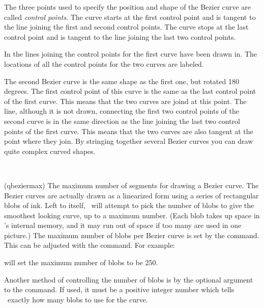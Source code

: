     The three points used to specify the position and shape of the
Bezier curve are called 
\emph{control points}. 
The curve starts at
the first control point and is tangent to the line joining the first
and second control points. The curve stops at the last control point
and is tangent to the line joining the last two control points.

    In  the lines joining the control points for the
first curve have been drawn in. The locations of all the control points
for the two curves are labeled. 

The second Bezier curve is the same shape
as the first one, but rotated 180 degrees. The first control point
of this curve is the same as the last control point of the first curve.
This means that the two curves are joind at this point. The line, 
although it is not drawn,
connecting the first two control points of the second curve is in the
same direction as the line joining the last two control points of the
first curve. This means that the two curves are also tangent at the
point where they join. By stringing together several Bezier curves
you can draw quite complex curved shapes.

\begin{syntax}
\cmd{\qbeziermax} \\
\end{syntax}
\glossary(qbeziermax)
{}{The maximum number of segments for drawing a Bezier curve.}
    The Bezier curves are actually drawn as a 
linearized form
using a series of rectangular
blobs of ink. Left to itself, \ltx\ will attempt to pick the number
of blobs to give the smoothest looking curve, up to a maximum number.
(Each blob takes up space in \ltx 's internal memory, and it may run
out of space if too many are used in one picture.) The maximum number
of blobs per Bezier curve is set by the \cmd{\qbeziermax} command. This
can be adjusted with the \cmd{\renewcommand} command. For example: 
\begin{lcode}
\renewcommand{\qbeziermax}{250}
\end{lcode}
will set the maximum number of blobs to be 250.

    Another method of controlling the number of blobs is by
the optional  argument to the \cmd{\qbezier} command.
If used, it must be a positive integer number which tells \ltx\
exactly how many blobs to use for the curve.



